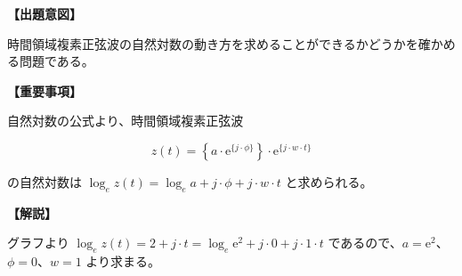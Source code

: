 \noindent \textbf{【出題意図】}

\bigskip
\noindent 時間領域複素正弦波の自然対数の動き方を求めることができるかどうかを確かめる問題である。

\vspace{1em}
\noindent \textbf{【重要事項】}

\medskip
\noindent 自然対数の公式より、時間領域複素正弦波 

\[
z(t) =  \left \{ a \cdot \textrm{e}^{\{j \cdot \phi\}} \right \} \cdot \textrm{e}^{\{j \cdot w \cdot t \}}
\]

\bigskip
\noindent の自然対数は $\log_e z(t) =  \log_e a + j \cdot \phi + j \cdot w \cdot t$ と求められる。

\bigskip

\vspace{1em}
\noindent \textbf{【解説】}

\bigskip
\noindent グラフより $\log_e z(t) =  2 + j \cdot t = \log_e \textrm{e}^2 + j \cdot 0 + j \cdot 1 \cdot t$ であるので、$a = \textrm{e}^2$、$\phi = 0$、$w=1$ より求まる。

